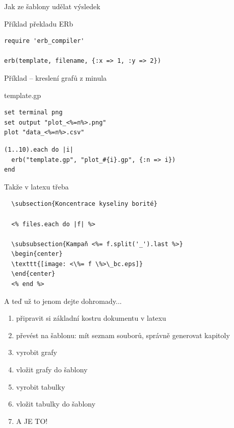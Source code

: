 \documentclass{beamer}
\begin{document}
\begin{frame}[fragile]{Jak ze šablony udělat výsledek}
  \scriptsize
  \begin{block}{Příklad překladu ERb}
    \scriptsize
    \begin{verbatim}
require 'erb_compiler'

erb(template, filename, {:x => 1, :y => 2})
    \end{verbatim}
  \end{block}
\end{frame}

\begin{frame}[fragile]{Příklad -- kreslení grafů z minula}
  \begin{block}{template.gp}
    \scriptsize
    \begin{verbatim}
set terminal png
set output "plot_<%=n%>.png"
plot "data_<%=n%>.csv"
    \end{verbatim}
  \end{block}
  \begin{block}{}
    \scriptsize
    \begin{verbatim}
(1..10).each do |i|
  erb("template.gp", "plot_#{i}.gp", {:n => i})
end
    \end{verbatim}
  \end{block}
\end{frame}

\begin{frame}[fragile]{Takže v latexu třeba}
\scriptsize
\begin{verbatim}
  \subsection{Koncentrace kyseliny borité}

  <% files.each do |f| %>

  \subsubsection{Kampaň <%= f.split('_').last %>}
  \begin{center}
  \texttt{[image: <\%= f \%>\_bc.eps]}
  \end{center}
  <% end %>
\end{verbatim}
\end{frame}

\begin{frame}{A teď už to jenom dejte dohromady...}
  \begin{enumerate}
    \item připravit si základní kostru dokumentu v latexu
    \item převést na šablonu: mít seznam souborů, správně generovat kapitoly
    \item vyrobit grafy
    \item vložit grafy do šablony
    \item vyrobit tabulky
    \item vložit tabulky do šablony
    \item A JE TO!
  \end{enumerate}
\end{frame}
\end{document}
